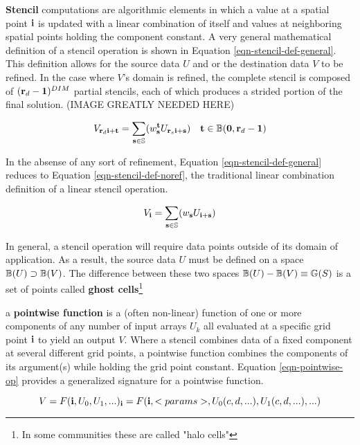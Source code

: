 \documentclass[12pt,a4paper]{article}
\begin{document}
\textbf{Stencil} computations are algorithmic elements in which a value at a spatial point $\mathbf{i}$ is updated with a linear combination of itself and values at neighboring spatial points holding the component constant. A very general mathematical definition of a stencil operation is shown in Equation \ref{eqn-stencil-def-general}. This definition allows for the source data $U$ and or the destination data $V$ to be refined. In the case where $V$'s domain is refined, the complete stencil is composed of $(\mathbf{r}_d - \mathbf{1})^{DIM}$ partial stencils, each of which produces a strided portion of the final solution. (IMAGE GREATLY NEEDED HERE)

\begin{equation}
\label{eqn-stencil-def-general}
V_{\mathbf{r}_d\mathbf{i} + \mathbf{t}} =
\sum_{\mathbf{s}\in\mathbb{S}}(w_{\mathbf{s}}^{\mathbf{t}}U_{\mathbf{r}_s\mathbf{i} + \mathbf{s}})
\quad\mathbf{t}\in\mathbb{B}(\mathbf{0},\mathbf{r}_d - \mathbf{1})
\end{equation}

In the absense of any sort of refinement, Equation \ref{eqn-stencil-def-general} reduces to Equation \ref{eqn-stencil-def-noref}, the traditional linear combination definition of a linear stencil operation.

\begin{equation}
\label{eqn-stencil-def-noref}
V_{\mathbf{i}} = \sum_{\mathbf{s}\in\mathbb{S}}(w_{\mathbf{s}}U_{\mathbf{i} + \mathbf{s}})
\end{equation}

In general, a stencil operation will require data points outside of its domain of application. As a result, the source data $U$ must be defined on a space $\mathbb{B}(U)\supset\mathbb{B}(V)$. The difference between these two spaces $\mathbb{B}(U) - \mathbb{B}(V)\equiv\mathbb{G}(S)$ is a set of points called \textbf{ghost cells}\footnote{In some communities these are called "halo cells"}

a \textbf{pointwise function} is a (often non-linear) function of one or more components of any number of input arrays $U_k$ all evaluated at a specific grid point $\mathbf{i}$ to yield an output $V$. Where a stencil combines data of a fixed component at several different grid points, a pointwise function combines the components of its argument(s) while holding the grid point constant. Equation \ref{eqn-pointwise-op} provides a generalized signature for a pointwise function.

\begin{equation}
\label{eqn-pointwise-op}
V = F(\mathbf{i}, U_0, U_1, ...)_{\mathbf{i}} = F(\mathbf{i} ,<params>, U_0(c,d,...), U_1(c,d,...), ...)
\end{equation}
\end{document}
